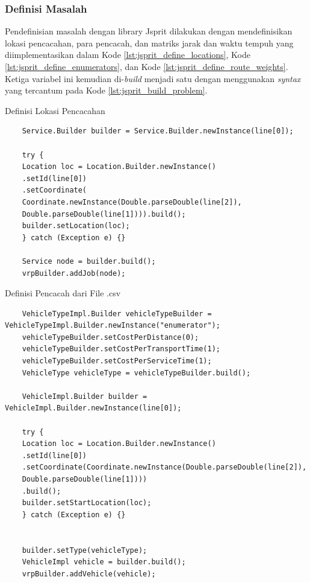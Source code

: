 \subsubsection{Definisi Masalah}
Pendefinisian masalah dengan library Jsprit dilakukan dengan mendefinisikan lokasi pencacahan, para pencacah, dan matriks jarak dan waktu tempuh yang diimplementasikan dalam Kode \ref{lst:jsprit_define_locations}, Kode \ref{lst:jsprit_define_enumerators}, dan Kode \ref{lst:jsprit_define_route_weights}. Ketiga variabel ini kemudian di-\textit{build} menjadi satu dengan menggunakan \textit{syntax} yang tercantum pada Kode \ref{lst:jsprit_build_problem}.


\begin{listing}[!]
	\caption{Definisi Lokasi Pencacahan}
	\label{lst:jsprit_define_locations}
	\begin{verbatim}
	Service.Builder builder = Service.Builder.newInstance(line[0]);
	
	try {
	Location loc = Location.Builder.newInstance()
	.setId(line[0])
	.setCoordinate(
	Coordinate.newInstance(Double.parseDouble(line[2]), 
	Double.parseDouble(line[1]))).build();
	builder.setLocation(loc);
	} catch (Exception e) {}
	
	Service node = builder.build();
	vrpBuilder.addJob(node);
	\end{verbatim}
\end{listing}


\begin{listing}[!]
	\caption{Definisi Pencacah dari File .csv}
	\label{lst:jsprit_define_enumerators}
	\begin{verbatim}
	VehicleTypeImpl.Builder vehicleTypeBuilder = VehicleTypeImpl.Builder.newInstance("enumerator");
	vehicleTypeBuilder.setCostPerDistance(0);
	vehicleTypeBuilder.setCostPerTransportTime(1);
	vehicleTypeBuilder.setCostPerServiceTime(1);
	VehicleType vehicleType = vehicleTypeBuilder.build();
	
	VehicleImpl.Builder builder = VehicleImpl.Builder.newInstance(line[0]);
	
	try {
	Location loc = Location.Builder.newInstance()
	.setId(line[0])
	.setCoordinate(Coordinate.newInstance(Double.parseDouble(line[2]),
	Double.parseDouble(line[1])))
	.build();
	builder.setStartLocation(loc);
	} catch (Exception e) {}
	
	
	builder.setType(vehicleType);
	VehicleImpl vehicle = builder.build();
	vrpBuilder.addVehicle(vehicle);
	\end{verbatim}
\end{listing}



